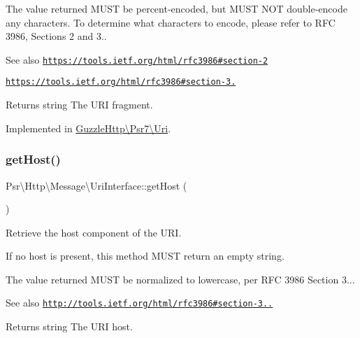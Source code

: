 The value returned M\+U\+ST be percent-\/encoded, but M\+U\+ST N\+OT double-\/encode any characters. To determine what characters to encode, please refer to R\+FC 3986, Sections 2 and 3..

\begin{DoxySeeAlso}{See also}
\href{https://tools.ietf.org/html/rfc3986#section-2}{\tt https\+://tools.\+ietf.\+org/html/rfc3986\#section-\/2} 

\href{https://tools.ietf.org/html/rfc3986#section-3.5}{\tt https\+://tools.\+ietf.\+org/html/rfc3986\#section-\/3.} 
\end{DoxySeeAlso}
\begin{DoxyReturn}{Returns}
string The U\+RI fragment. 
\end{DoxyReturn}


Implemented in \hyperlink{classGuzzleHttp_1_1Psr7_1_1Uri_aeda26bc60e5aef6d506ce43be28409ca}{Guzzle\+Http\textbackslash{}\+Psr7\textbackslash{}\+Uri}.

\mbox{\label{interfacePsr_1_1Http_1_1Message_1_1UriInterface_a5dbe0ede7395fd19fca8fafe023aa285}} 
\subsubsection{\texorpdfstring{get\+Host()}{getHost()}}
{\footnotesize\ttfamily Psr\textbackslash{}\+Http\textbackslash{}\+Message\textbackslash{}\+Uri\+Interface\+::get\+Host (\begin{DoxyParamCaption}{ }\end{DoxyParamCaption})}

Retrieve the host component of the U\+RI.

If no host is present, this method M\+U\+ST return an empty string.

The value returned M\+U\+ST be normalized to lowercase, per R\+FC 3986 Section 3...

\begin{DoxySeeAlso}{See also}
\href{http://tools.ietf.org/html/rfc3986#section-3.2.2}{\tt http\+://tools.\+ietf.\+org/html/rfc3986\#section-\/3..} 
\end{DoxySeeAlso}
\begin{DoxyReturn}{Returns}
string The U\+RI host. 
\end{DoxyReturn}


